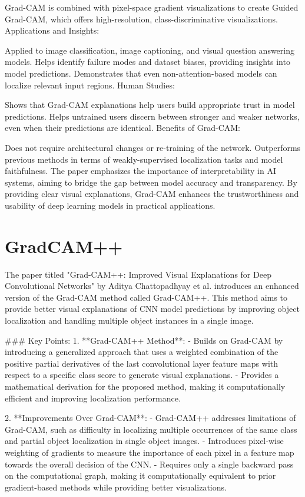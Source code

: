 Grad-CAM is combined with pixel-space gradient visualizations to create Guided Grad-CAM, which offers high-resolution, class-discriminative visualizations.
Applications and Insights:

Applied to image classification, image captioning, and visual question answering models.
Helps identify failure modes and dataset biases, providing insights into model predictions.
Demonstrates that even non-attention-based models can localize relevant input regions.
Human Studies:

Shows that Grad-CAM explanations help users build appropriate trust in model predictions.
Helps untrained users discern between stronger and weaker networks, even when their predictions are identical.
Benefits of Grad-CAM:

Does not require architectural changes or re-training of the network.
Outperforms previous methods in terms of weakly-supervised localization tasks and model faithfulness.
The paper emphasizes the importance of interpretability in AI systems, aiming to bridge the gap between model accuracy and transparency. By providing clear visual explanations, Grad-CAM enhances the trustworthiness and usability of deep learning models in practical applications.

\section{GradCAM++}
The paper titled "Grad-CAM++: Improved Visual Explanations for Deep Convolutional Networks" by Aditya Chattopadhyay et al. introduces an enhanced version of the Grad-CAM method called Grad-CAM++. This method aims to provide better visual explanations of CNN model predictions by improving object localization and handling multiple object instances in a single image.

### Key Points:
1. **Grad-CAM++ Method**:
   - Builds on Grad-CAM by introducing a generalized approach that uses a weighted combination of the positive partial derivatives of the last convolutional layer feature maps with respect to a specific class score to generate visual explanations.
   - Provides a mathematical derivation for the proposed method, making it computationally efficient and improving localization performance.

2. **Improvements Over Grad-CAM**:
   - Grad-CAM++ addresses limitations of Grad-CAM, such as difficulty in localizing multiple occurrences of the same class and partial object localization in single object images.
   - Introduces pixel-wise weighting of gradients to measure the importance of each pixel in a feature map towards the overall decision of the CNN.
   - Requires only a single backward pass on the computational graph, making it computationally equivalent to prior gradient-based methods while providing better visualizations.

